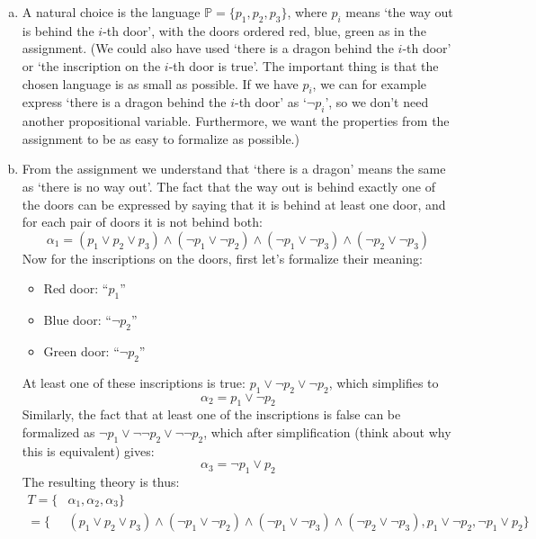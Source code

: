 \begin{problem}
    \begin{solution}
        \begin{enumerate}[(a)]
            \item A natural choice is the language $\mathbb P=\{p_1, p_2, p_3\}$, where $p_i$ means `the way out is behind the $i$-th door', with the doors ordered red, blue, green as in the assignment. (We could also have used `there is a dragon behind the $i$-th door' or `the inscription on the $i$-th door is true'. The important thing is that the chosen language is as small as possible. If we have $p_i$, we can for example express `there is a dragon behind the $i$-th door' as `$\neg p_i$', so we don’t need another propositional variable. Furthermore, we want the properties from the assignment to be as easy to formalize as possible.)
            \item From the assignment we understand that `there is a dragon' means the same as `there is no way out'. The fact that the way out is behind exactly one of the doors can be expressed by saying that it is behind at least one door, and for each pair of doors it is not behind both:
            $$
            \alpha_1=(p_1\lor p_2\lor p_3) \land (\neg p_1\lor\neg p_2) \land  (\neg p_1\lor\neg p_3) \land (\neg p_2\lor\neg p_3)
            $$
            Now for the inscriptions on the doors, first let’s formalize their meaning:
            \begin{itemize}
                \item Red door: ``$p_1$''
                \item Blue door: ``$\neg p_2$''
                \item Green door: ``$\neg p_2$''
            \end{itemize}
            At least one of these inscriptions is true: $p_1\lor \neg p_2\lor\neg p_2$, which simplifies to
            $$
            \alpha_2=p_1\lor \neg p_2
            $$
            Similarly, the fact that at least one of the inscriptions is false can be formalized as $\neg p_1\lor \neg \neg p_2\lor\neg \neg p_2$, which after simplification (think about why this is equivalent) gives:
            $$
            \alpha_3=\neg p_1\lor p_2
            $$
            The resulting theory is thus:
            \begin{align*}
                T=\{&\alpha_1,\alpha_2,\alpha_3\}\\=\{&(p_1\lor p_2\lor p_3) \land (\neg p_1\lor\neg p_2) \land  (\neg p_1\lor\neg p_3) \land (\neg p_2\lor\neg p_3), p_1\lor \neg p_2, \neg p_1\lor p_2\}

\end{align*}
\end{enumerate}
\end{solution}
\end{problem}
